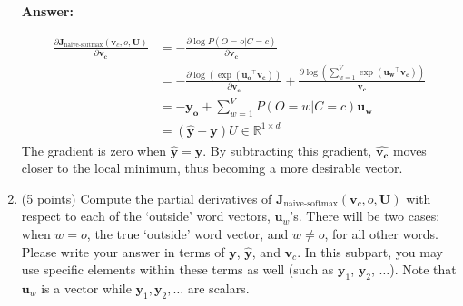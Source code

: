 \documentclass{article}
\newenvironment{answer}{
        {\bf Answer:} \sf \begingroup\color{red}
    }{\endgroup}%
\begin{document}
\begin{enumerate}
        \begin{shaded}
            \begin{answer}
                \[
                    \begin{aligned}
                        \frac{\partial \bm J_{\text{naive-softmax}}(\bm v_c, o, \bm U)}{\partial \bm{v_c}}
                        &= - \frac{\partial \log P(O=o | C=c)}{\partial \bm{v_c}} \\
                        &= - \frac{\partial \log(\exp(\bm{u_o}^\top \bm{v_c}))}{\partial \bm{v_c}} + \frac{\partial \log(\sum_{w=1}^{V} \exp(\bm{u_w}^\top \bm{v_c}))}{\bm{v_c}} \\
                        &= - \bm{y_o} + \sum_{w=1}^{V} P(O=w|C=c)\bm{u_w} \\
                        &= (\hat{\bm{y}} - \bm{y}) U \in \mathbb{R}^{1 \times d}
                    \end{aligned}
                \]
                The gradient is zero when $ \hat{\bm{y}} = \bm{y} $.
                By subtracting this gradient, $\hat{\bm{v_c}}$ moves closer to the local minimum, thus becoming
                a more desirable vector.
            \end{answer}
        \end{shaded}

        \item (5 points) Compute the partial derivatives of $\bm J_{\text{naive-softmax}}(\bm v_c, o, \bm U)$ with respect to each of the `outside' word vectors, $\bm u_w$'s. There will be two cases: when $w=o$, the true `outside' word vector, and $w \neq o$, for all other words. Please write your answer in terms of $\bm y$, $\hat{\bm y}$, and $\bm v_c$. In this subpart, you may use specific elements within these terms as well (such as $\bm y_1$, $\bm y_2$, $\dots$). Note that $\bm u_w$ is a vector while $\bm y_1, \bm y_2, \dots$ are scalars.


\end{enumerate}
\end{document}
